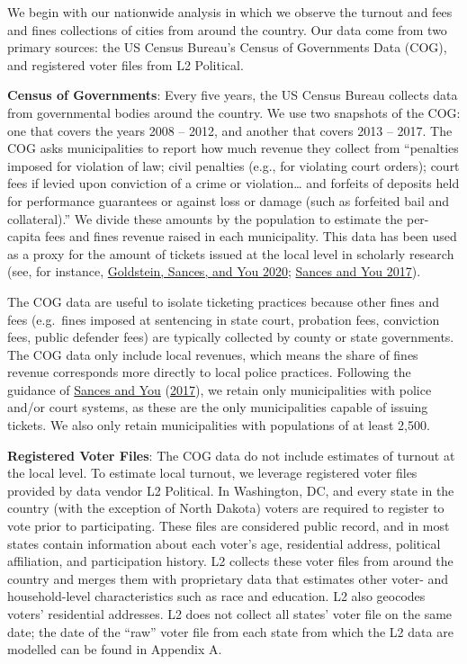 \documentclass[
  12pt,
]{article}
\begin{document}
We begin with our nationwide analysis in which we observe the turnout and fees and fines collections of cities from around the country. Our data come from two primary sources: the US Census Bureau's Census of Governments Data (COG), and registered voter files from L2 Political.

\textbf{Census of Governments}: Every five years, the US Census Bureau collects data from governmental bodies around the country. We use two snapshots of the COG: one that covers the years 2008 -- 2012, and another that covers 2013 -- 2017. The COG asks municipalities to report how much revenue they collect from ``penalties imposed for violation of law; civil penalties (e.g., for violating court orders); court fees if levied upon conviction of a crime or violation\ldots{} and forfeits of deposits held for performance guarantees or against loss or damage (such as forfeited bail and collateral).'' We divide these amounts by the population to estimate the per-capita fees and fines revenue raised in each municipality. This data has been used as a proxy for the amount of tickets issued at the local level in scholarly research (see, for instance, \protect\hyperlink{ref-Goldstein2020}{Goldstein, Sances, and You 2020}; \protect\hyperlink{ref-Sances2017}{Sances and You 2017}).

The COG data are useful to isolate ticketing practices because other fines and fees (e.g.~fines imposed at sentencing in state court, probation fees, conviction fees, public defender fees) are typically collected by county or state governments. The COG data only include local revenues, which means the share of fines revenue corresponds more directly to local police practices. Following the guidance of \protect\hyperlink{ref-Sances2017}{Sances and You} (\protect\hyperlink{ref-Sances2017}{2017}), we retain only municipalities with police and/or court systems, as these are the only municipalities capable of issuing tickets. We also only retain municipalities with populations of at least 2,500.

\textbf{Registered Voter Files}: The COG data do not include estimates of turnout at the local level. To estimate local turnout, we leverage registered voter files provided by data vendor L2 Political. In Washington, DC, and every state in the country (with the exception of North Dakota) voters are required to register to vote prior to participating. These files are considered public record, and in most states contain information about each voter's age, residential address, political affiliation, and participation history. L2 collects these voter files from around the country and merges them with proprietary data that estimates other voter- and household-level characteristics such as race and education. L2 also geocodes voters' residential addresses. L2 does not collect all states' voter file on the same date; the date of the ``raw'' voter file from each state from which the L2 data are modelled can be found in Appendix A.
\end{document}
